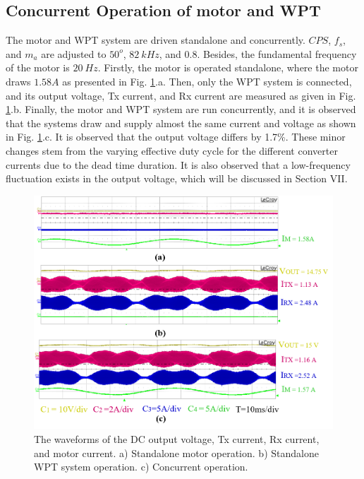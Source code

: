 \documentclass[journal]{IEEEtran}
\begin{document}
\subsection{Concurrent Operation of motor and WPT}
The motor and WPT system are driven standalone and concurrently. 
$CPS$, $f_s$, and $m_a$ are adjusted to  $50^o$, $82~kHz$, and $0.8$. 
Besides, the fundamental frequency of the motor is $20~Hz$.    
Firstly, the motor is operated standalone,  where the motor draws $1.58A$ as presented in Fig. \ref{fig:concurrent}.a.  
Then,  only the WPT system is connected, and its output voltage, Tx current, and Rx current are measured as given in Fig. \ref{fig:concurrent}.b.  
Finally, the motor and WPT system are run concurrently, and it is observed that the systems draw and supply almost the same current and voltage as shown in Fig. \ref{fig:concurrent}.c. 
It is observed that the output voltage differs by 1.7\%.
These minor changes stem from the varying effective duty cycle for the different converter currents due to the dead time duration.
It is also observed that a low-frequency fluctuation exists in the output voltage, which will be discussed in Section VII.
\begin{figure}[h!]
\centering
\includegraphics[width=1\linewidth]{concurrent_operation.png} 
\caption{ The waveforms of the DC output voltage, Tx current, Rx current, and motor current. a)  Standalone motor operation. b) Standalone WPT system operation. c) Concurrent operation.}
    \label{fig:concurrent}
\end{figure}
\vspace*{-5mm}
\end{document}
